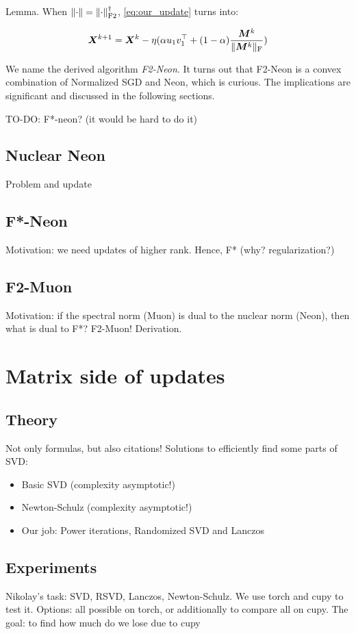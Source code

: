 \documentclass{article} %
\newcommand{\norm}[1]{\lVert #1\rVert}
\DeclarePairedDelimiter{\normf}{\|}{\|_\mathrm{F}}
\DeclarePairedDelimiter{\normftwo}{\|}{\|_\mathrm{F2}}
\begin{document}
Lemma. When $\norm{\cdot} = \normftwo{\cdot}^\dagger$, \cref{eq:our_update} turns into:

\begin{equation}\label{eq:nsgd_neon_update}
    \mX^{k+1} = \mX^{k} - \eta (\alpha u_1 v_1^\top + (1-\alpha)\frac{\mM^k}{\normf{\mM^k}})
\end{equation}

We name the derived algorithm \emph{F2-Neon}. It turns out that F2-Neon is a convex combination of Normalized SGD and Neon, which is curious. The implications are significant and discussed in the following sections.

TO-DO: F*-neon? (it would be hard to do it)


\subsection{Nuclear Neon}
Problem and update
\subsection{F*-Neon}
Motivation: we need updates of higher rank. Hence, F* (why? regularization?)
\subsection{F2-Muon}
Motivation: if the spectral norm (Muon) is dual to the nuclear norm (Neon), then what is dual to F*? F2-Muon! Derivation.

\section{Matrix side of updates}
\subsection{Theory}
Not only formulas, but also citations!
Solutions to efficiently find some parts of SVD:
\begin{itemize}
    \item Basic SVD (complexity asymptotic!)
    \item Newton-Schulz (complexity asymptotic!)
    \item Our job: Power iterations, Randomized SVD and Lanczos
\end{itemize}
\subsection{Experiments}
Nikolay's task: SVD, RSVD, Lanczos, Newton-Schulz. We use torch and cupy to test it.
Options: all possible on torch, or additionally to compare all on cupy. The goal: to find how much do we lose due to cupy
\end{document}
